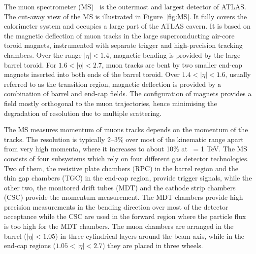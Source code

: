 \documentclass[letterpaper,12pt]{article}
\begin{document}
	
	The muon spectrometer (MS)~\cite{ATLAS-TDR-11} is the 
	outermost and largest detector of ATLAS. 
	The cut-away view of the MS is illustrated in Figure~\ref{fig:MS}.
	It fully covers the	calorimeter system and occupies a large part of the ATLAS cavern. 
	It is based on the magnetic deflection of muon tracks in the 
	large superconducting air-core toroid magnets, instrumented with
	separate trigger and high-precision tracking chambers. 
	Over the range $|\eta|< 1.4$, magnetic bending is provided by the large 
	barrel toroid. For $1.6 < |\eta|< 2.7$, muon tracks are bent by two smaller
	end-cap magnets inserted into both ends of the barrel toroid. 
	Over $1.4 < |\eta|< 1.6$, usually referred to as the transition region, 
	magnetic deflection is provided by a combination of barrel and end-cap
	fields. The configuration of magnets provides a field mostly orthogonal 
	to the muon trajectories, hence minimising the degradation of 
	resolution due to multiple scattering. 


	The MS measures momentum of muons tracks depends on the momentum 
	of the tracks. 
	The resolution is typically 2–3\% over most of the kinematic range
	apart from very high momenta, where it increases to about 10\% at \pt\ = 1 TeV.  
	The MS consists of four subsystems which rely on four different gas detector
	technologies. Two of them, the resistive plate chambers (RPC) in the barrel region 
	and the thin gap chambers (TGC) in the end-cap region, provide trigger signals, 
	while the other two, the monitored drift tubes (MDT) and the cathode strip 
	chambers (CSC) provide the momentum measurement. The MDT chambers provide high 
	precision measurements in the bending direction over most of the detector
	acceptance while the CSC are used in the forward region where the particle flux 
	is too high for the MDT	chambers. The muon chambers are arranged in the barrel 
	($|\eta| < 1.05$) in three cylindrical layers around the beam axis, 
	while in the end-cap regions ($1.05 < |\eta| < 2.7$) they are placed in three wheels.
\end{document}
